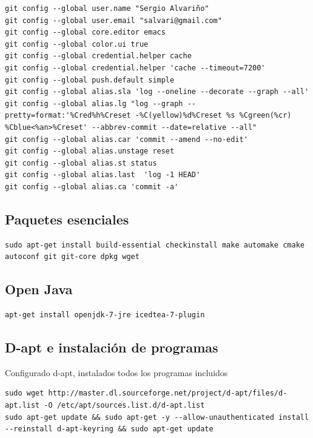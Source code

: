 \documentclass[12pt,spanish,]{scrartcl}
\begin{document}
\begin{verbatim}
git config --global user.name "Sergio Alvariño"
git config --global user.email "salvari@gmail.com"
git config --global core.editor emacs
git config --global color.ui true
git config --global credential.helper cache
git config --global credential.helper 'cache --timeout=7200'
git config --global push.default simple
git config --global alias.sla 'log --oneline --decorate --graph --all'
git config --global alias.lg "log --graph --pretty=format:'%Cred%h%Creset -%C(yellow)%d%Creset %s %Cgreen(%cr) %Cblue<%an>%Creset' --abbrev-commit --date=relative --all"
git config --global alias.car 'commit --amend --no-edit'
git config --global alias.unstage reset
git config --global alias.st status
git config --global alias.last  'log -1 HEAD'
git config --global alias.ca 'commit -a'
\end{verbatim}

\subsection{Paquetes esenciales}\label{paquetes-esenciales}

\begin{verbatim}
sudo apt-get install build-essential checkinstall make automake cmake autoconf git git-core dpkg wget
\end{verbatim}

\subsection{Open Java}\label{open-java}

\begin{verbatim}
apt-get install openjdk-7-jre icedtea-7-plugin
\end{verbatim}

\subsection{D-apt e instalación de
programas}\label{d-apt-e-instalaciuxf3n-de-programas}

Configurado d-apt, instalados todos los programas incluidos

\begin{verbatim}
sudo wget http://master.dl.sourceforge.net/project/d-apt/files/d-apt.list -O /etc/apt/sources.list.d/d-apt.list
sudo apt-get update && sudo apt-get -y --allow-unauthenticated install --reinstall d-apt-keyring && sudo apt-get update
\end{verbatim}
\end{document}
